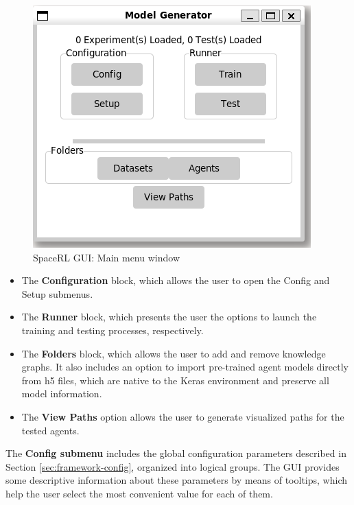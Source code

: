 \begin{figure}[!h]
    \centering
    \includegraphics[width=.45\textwidth]{fig/framework/GUI/mm_default}
    \caption{SpaceRL GUI: Main menu window}
    \label{fig:mm_default}
\end{figure}

\begin{itemize}
    \item The \textbf{Configuration} block, which allows the user to open the Config and Setup submenus.
    
    \item The \textbf{Runner} block, which presents the user the options to launch the training and testing processes, respectively.
    
    \item The \textbf{Folders} block, which allows the user to add and remove knowledge graphs. It also includes an option to import pre-trained agent models directly from h5 files, which are native to the Keras environment and preserve all model information.
    
    \item The \textbf{View Paths} option allows the user to generate visualized paths for the tested agents.
\end{itemize}

The \textbf{Config submenu} includes the global configuration parameters described in Section \ref{sec:framework-config}, organized into logical groups. The GUI provides some  descriptive information about these parameters by means of tooltips, which help the user select the most convenient value for each of them. 

